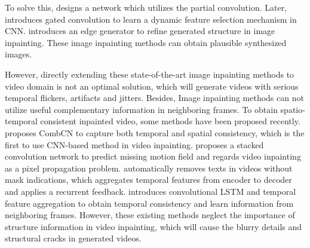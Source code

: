 To solve this,
 \cite{liu2018partialinpainting} designs a network which utilizes the partial convolution. Later, \cite{yu2018free} introduces gated convolution to learn a dynamic feature selection mechanism in CNN.  \cite{nazeri2019edgeconnect} introduces an edge generator to refine generated structure in image inpainting. These image inpainting methods can obtain plausible synthesized images. 
 

 However, directly extending these state-of-the-art image inpainting methods to video domain is not an optimal solution, which will generate videos with serious temporal flickers, artifacts and jitters. Besides, Image inpainting methods can not utilize useful complementary information in neighboring frames. To obtain spatio-temporal consistent inpainted video, some methods have been proposed recently.
\cite{wang2019video} proposes CombCN to capture both temporal and spatial consistency, which is the first to use CNN-based method in video inpainting. \cite{Xu_2019_CVPR} proposes a stacked convolution network to predict missing motion field and regards video inpainting as a pixel propagation problem. \cite{Kim_2019_CVPR} automatically removes texts in videos without mask indications, which aggregates temporal features from encoder to decoder and applies a recurrent feedback. \cite{Kim_2019_CVPR1} introduces convolutional LSTM and temporal feature aggregation to obtain temporal consistency and learn information from neighboring frames. However, these existing methods neglect the importance of structure information in video inpainting, which will cause the blurry details and structural cracks in generated videos. 



